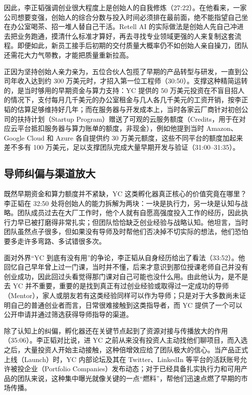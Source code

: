 \documentclass[UTF8,a4paper,11pt,fontset=fandol]{ctexart}
\begin{document}
因此，李正韬强调创业很大程度上是创始人的自我修炼（27:22）。在他看来，一家公司想要变强，创始人的综合分数与投入时间必须排在最前面，绝不能指望自己坐在办公室喝茶、招一堆人替自己干活。Retell AI 的实际做法是创始人先自己冲进去把业务跑通，摸清什么标准才算好，再去寻找专业领域更强的人来复制这套流程。即便如此，新员工接手后初期的交付质量大概率仍不如创始人亲自操刀，团队还需花大力气带教，才能把质量重新拉高。

正因为坚持创始人亲力亲为，五位合伙人包揽了早期的产品转型与研发，一直到公司年收入达到约 300 万美元时，才招入第一位工程师（30:50）。支撑这种精简运转的，是当时够用的早期资金与算力支持：YC 提供的 50 万美元投资在不盲目招人的情况下，支付每月几千美元的办公室租金与几人各几千美元的工资开销，按李正韬的估算足够维持好几年；而在服务器与开发成本上，当时各家云厂商针对初创公司的扶持计划（Startup Program）赠送了可观的云服务额度（Credits，用于在对应云平台抵扣服务器与算力账单的额度，非现金），例如他提到当时 Amazon、Google Cloud 和 Azure 各自提供约 30 万美元额度，这些不同平台的额度加起来差不多有 100 万美元，足以支撑团队完成大量早期开发与验证（31:00–31:35）。

\subsection{导师纠偏与渠道放大}
既然早期资金和算力额度并不紧缺，YC 这类孵化器真正核心的价值究竟在哪里？李正韬在 32:50 处将创始人的能力拆解为两块：一块是执行力，另一块是认知与战略。团队成员过去在大厂工作时，他个人就有自愿高强度投入工作的经历，因此执行力早已被打磨得非常扎实；但团队恰恰缺乏创业经验与战略认知。他坦言，当时团队虽然点子很多，但如果没有导师及时帮他们否决掉不切实际的想法，他们恐怕要多走许多弯路、多试错很多次。

面对外界“YC 到底有没有用”的争论，李正韬从自身经历给出了看法（33:52）。他回忆自己早年曾上过一门课，当时并不懂，后来才意识到那位授课老师自己并没有创业成功，因此回过头看觉得那门课对自己可能也没什么用。由此他认为，是不是去 YC 并不重要，重要的是找到真正有过创业经验或取得过一定成功的导师（Mentor），家人或朋友若有这类经验同样可以作为导师；只是对于大多数尚未证明自己的普通创业者而言，日常很难接触到这类指导者，而 YC 提供了一个可以公开申请并通过筛选获得导师指导的渠道。

除了认知上的纠偏，孵化器还在关键节点起到了资源对接与传播放大的作用（35:06）。李正韬对比说，进 YC 之前从来没有投资人主动找他们聊项目，而入选之后，大量投资人开始主动接触，这种倍增效应给了团队极大的信心。当产品正式上线（Launch）时，YC 内部论坛及其在 Twitter、LinkedIn 等平台的活跃账号允许被投企业（Portfolio Companies）发布动态；对于已经具备扎实执行力和可用产品的团队来说，这种集中曝光就像关键的一点“燃料”，帮他们迅速点燃了早期的市场传播。
\end{document}
